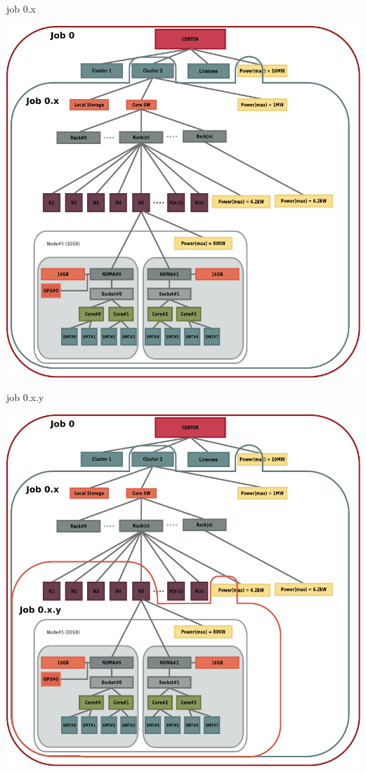\documentclass[default,pdf,colorBG,slideColor]{prosper}
\begin{document}
\begin{slide}{job 0.x}{\small
\begin{center}
  \includegraphics[scale=0.50]{job-hierarchy-job0-x}
\end{center}
}\end{slide}
\begin{slide}{job 0.x.y}{\small
\begin{center}
  \includegraphics[scale=0.50]{job-hierarchy-job0-x-y}
\end{center}
}\end{slide}
\end{document}
